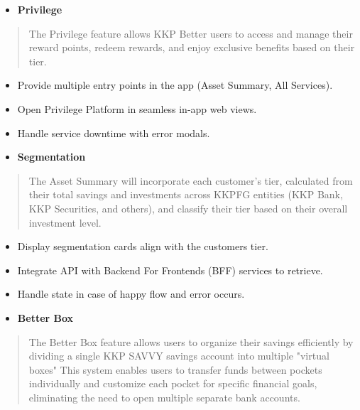 \begin{itemize}
\item
  \textbf{Privilege}
\end{itemize}

\begin{quote}
The Privilege feature allows KKP Better users to access and manage their
reward points, redeem rewards, and enjoy exclusive benefits based on
their tier.
\end{quote}

\begin{itemize}
\item
  Provide multiple entry points in the app (Asset Summary, All
  Services).
\item
  Open Privilege Platform in seamless in-app web views.
\item
  Handle service downtime with error modals.
\end{itemize}

\begin{itemize}
\item
  \textbf{Segmentation}
\end{itemize}

\begin{quote}
The Asset Summary will incorporate each customer's tier, calculated from
their total savings and investments across KKPFG entities (KKP Bank, KKP
Securities, and others), and classify their tier based on their overall
investment level.
\end{quote}

\begin{itemize}
\item
  Display segmentation cards align with the customer\textquotesingle s
  tier.
\item
  Integrate API with Backend For Frontends (BFF) services to retrieve.
\item
  Handle state in case of happy flow and error occurs.
\end{itemize}

\begin{itemize}
\item
  \textbf{Better Box}
\end{itemize}

\begin{quote}
The Better Box feature allows users to organize their savings
efficiently by dividing a single KKP SAVVY savings account into multiple
"virtual boxes" This system enables users to transfer funds between
pockets individually and customize each pocket for specific financial
goals, eliminating the need to open multiple separate bank accounts.
\end{quote}

